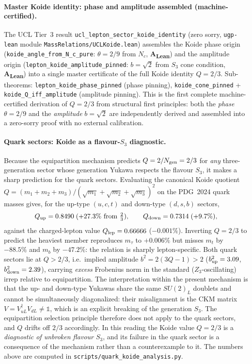 \documentclass[11pt]{article}
\newcommand{\CatAL}{\textbf{A\textsubscript{Lean}}}
\theoremstyle{remark}
\begin{document}
\paragraph{Master Koide identity: phase and amplitude assembled (machine-certified).}
The UCL Tier~3 result \texttt{ucl\_lepton\_sector\_koide\_identity} (zero sorry,
\texttt{ugp-lean} module \texttt{MassRelations/UCLKoide.lean}) assembles the Koide phase
origin (\texttt{koide\_angle\_from\_N\_c\_pure}: $\theta = 2/9$ from $N_c$, \CatAL) and
the amplitude origin (\texttt{lepton\_koide\_amplitude\_pinned}: $b=\sqrt{2}$ from $S_3$
cone condition, \CatAL) into a single master certificate of the full Koide identity $Q=2/3$.
Sub-theorems: \texttt{lepton\_koide\_phase\_pinned} (phase pinning),
\texttt{koide\_cone\_pinned} + \texttt{koide\_Q\_iff\_amplitude} (amplitude pinning).
This is the first complete machine-certified derivation of $Q=2/3$ from structural first
principles: both the \emph{phase} $\theta = 2/9$ and the \emph{amplitude} $b = \sqrt{2}$
are independently derived and assembled into a zero-sorry proof with no external
calibration.

\paragraph{Quark sectors: Koide as a flavour-$S_3$ diagnostic.}
Because the equipartition mechanism predicts $Q = 2/N_{\rm gen} = 2/3$ for \emph{any} three-generation sector whose generation Yukawa respects the flavour $S_3$, it makes a sharp prediction for the quark sectors.  Evaluating the canonical Koide quotient $Q = (m_1+m_2+m_3)/(\sqrt{m_1}+\sqrt{m_2}+\sqrt{m_3})^2$ on the PDG~2024 quark masses gives, for the up-type $(u,c,t)$ and down-type $(d,s,b)$ sectors,
\begin{equation}
Q_{\rm up} = 0.8490 \;(+27.3\%\ \text{from}\ \tfrac23), \qquad Q_{\rm down} = 0.7314 \;(+9.7\%),
\label{eq:quark_koide}
\end{equation}
against the charged-lepton value $Q_{\rm lep} = 0.66666$ ($-0.001\%$).  Inverting $Q = 2/3$ to predict the heaviest member reproduces $m_\tau$ to $+0.006\%$ but misses $m_t$ by $-88.5\%$ and $m_b$ by $-47.2\%$: the relation is sharply lepton-specific.  Both quark sectors lie at $Q > 2/3$, i.e.\ implied amplitude $b^2 = 2(3Q-1) > 2$ ($b^2_{\rm up} = 3.09$, $b^2_{\rm down} = 2.39$), carrying \emph{excess} Frobenius norm in the standard ($Z_3$-oscillating) irrep relative to equipartition.  The interpretation within the present mechanism is that the up- and down-type Yukawas share the same $SU(2)_L$ doublets and cannot be simultaneously diagonalized: their misalignment is the CKM matrix $V = V_{uL}^\dagger V_{dL} \neq \mathbb{1}$, which is an explicit breaking of the generation $S_3$.  The equipartition selection principle therefore does not apply to the quark sectors, and $Q$ drifts off $2/3$ accordingly.  In this reading the Koide value $Q = 2/3$ is a \emph{diagnostic of unbroken flavour $S_3$}, and its failure in the quark sector is a consequence of the mechanism rather than a counterexample to it.  The numbers above are computed in \nolinkurl{scripts/quark_koide_analysis.py}.
\end{document}
